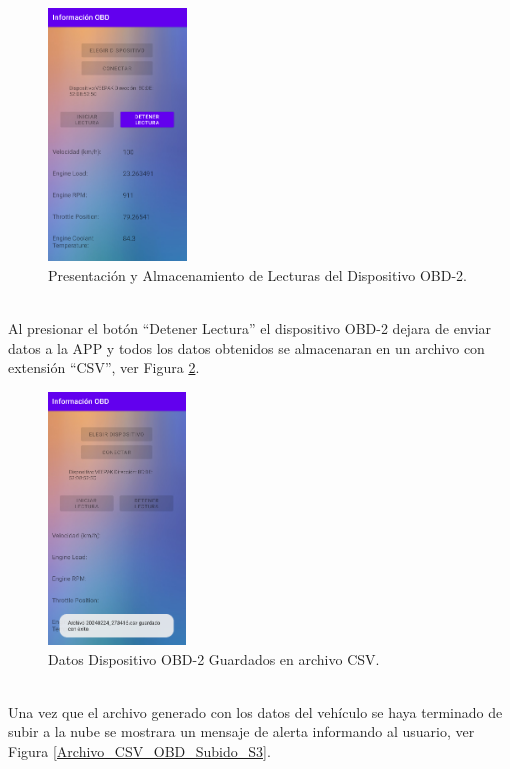 \documentclass[a4paper,10pt, oneside, titlepage]{article}
\begin{document}
	\begin{figure}[!h]
		\centering
		\includegraphics[width = 0.45\linewidth, height = 6.7cm]{Presentacion_Almacenamiento_Lecturas_OBD.png}
		\caption{Presentación y Almacenamiento de Lecturas del Dispositivo OBD-2.}
		\label{Presentacion_Almacenamiento_Lecturas_OBD}
	\end{figure} \\
	\indent Al presionar el botón ``Detener Lectura'' el dispositivo OBD-2 dejara de enviar datos a la APP y todos los datos obtenidos se almacenaran en un archivo con extensión ``CSV'', ver Figura \ref{Datos_OBD_Guardados_CSV}.
	\begin{figure}[!h]
		\centering
		\includegraphics[width = 0.45\linewidth, height = 6.7cm]{Datos_OBD_Guardados_CSV.png}
		\caption{Datos Dispositivo OBD-2 Guardados en archivo CSV.}
		\label{Datos_OBD_Guardados_CSV}
	\end{figure} \\
	\indent Una vez que el archivo generado con los datos del vehículo se haya terminado de subir a la nube se mostrara un mensaje de alerta informando al usuario, ver Figura \ref{Archivo_CSV_OBD_Subido_S3}.
\end{document}
